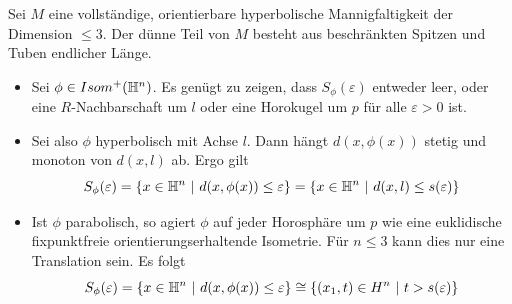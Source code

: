 \documentclass{book}
\renewcommand{\epsilon}{\varepsilon}
\begin{document}
\Prop{}
Sei $M$ eine vollständige, orientierbare hyperbolische Mannigfaltigkeit der Dimension $\leq 3$. Der dünne Teil von $M$ besteht aus beschränkten Spitzen und Tuben endlicher Länge.
\begin{Beweis}{}
	\begin{itemize}
		\item Sei $\phi \in Isom^+(\mathbb{H}^n)$. Es genügt zu zeigen, dass $S_\phi(\epsilon)$ entweder leer, oder eine $R$-Nachbarschaft um $l$ oder eine Horokugel um $p$ für alle $\epsilon > 0$ ist.
		\item Sei also $\phi$ hyperbolisch mit Achse $l$. Dann hängt $d(x,\phi(x))$ stetig und monoton von $d(x,l)$ ab. Ergo gilt
		\[ S_\phi(\epsilon) = \set{ x\in\H^n }{d(x,\phi(x)) \leq \epsilon} = \set{x\in \H^n}{d(x,l) \leq s(\epsilon)} \]
		\item Ist $\phi$ parabolisch, so agiert $\phi$ auf jeder Horosphäre um $p$ wie eine euklidische fixpunktfreie orientierungserhaltende Isometrie. Für $n\leq 3$ kann dies nur eine Translation sein. Es folgt
		\[ S_\phi(\epsilon) = \set{ x\in\H^n }{d(x,\phi(x)) \leq \epsilon} \isom{} \set{(x_1, t)\in H^n}{ t > s(\epsilon) } \]
	\end{itemize}
\end{Beweis}
\end{document}
